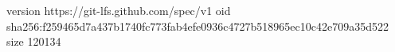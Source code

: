 version https://git-lfs.github.com/spec/v1
oid sha256:f259465d7a437b1740fc773fab4efe0936c4727b518965ec10c42e709a35d522
size 120134
